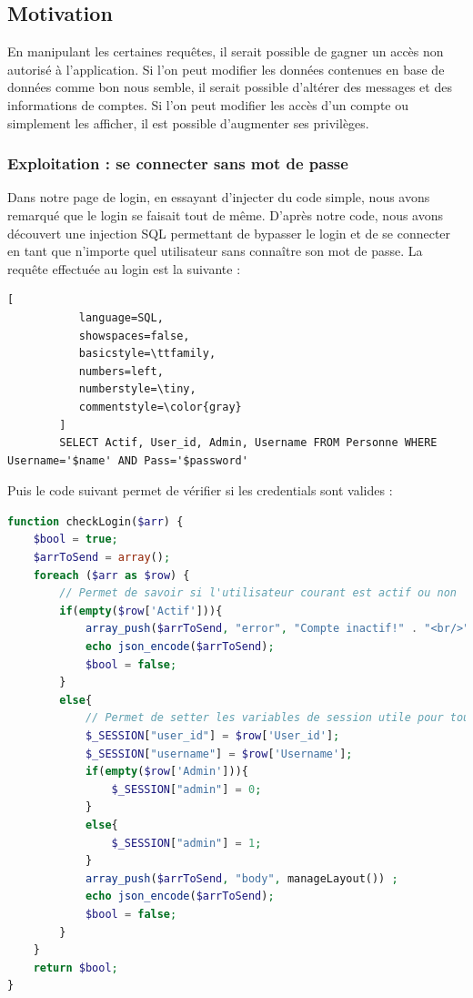 \documentclass[12pt]{article}
\begin{document}
\subsection{Motivation}
En manipulant les certaines requêtes, il serait possible de gagner un accès non autorisé à l'application. Si l'on peut modifier les données contenues en base de données comme bon nous semble, il serait possible d'altérer des messages et des informations de comptes. Si l'on peut modifier les accès d'un compte ou simplement les afficher, il est possible d'augmenter ses privilèges.
\subsubsection{Exploitation : se connecter sans mot de passe}
Dans notre page de login, en essayant d'injecter du code simple, nous avons remarqué que le login se faisait tout de même. D'après notre code, nous avons découvert une injection SQL permettant de bypasser le login et de se connecter en tant que n'importe quel utilisateur sans connaître son mot de passe. La requête effectuée au login est la suivante :

\begin{lstlisting}[
           language=SQL,
           showspaces=false,
           basicstyle=\ttfamily,
           numbers=left,
           numberstyle=\tiny,
           commentstyle=\color{gray}
        ]
        SELECT Actif, User_id, Admin, Username FROM Personne WHERE Username='$name' AND Pass='$password'
\end{lstlisting}

Puis le code suivant permet de vérifier si les credentials sont valides : 

\begin{lstlisting}[language=PHP]
function checkLogin($arr) {
    $bool = true;
    $arrToSend = array();
    foreach ($arr as $row) {
        // Permet de savoir si l'utilisateur courant est actif ou non
        if(empty($row['Actif'])){
            array_push($arrToSend, "error", "Compte inactif!" . "<br/>") ;
            echo json_encode($arrToSend);
            $bool = false;
        }
        else{
            // Permet de setter les variables de session utile pour toute la connection
            $_SESSION["user_id"] = $row['User_id'];
            $_SESSION["username"] = $row['Username'];
            if(empty($row['Admin'])){
                $_SESSION["admin"] = 0;
            }
            else{
                $_SESSION["admin"] = 1;
            }
            array_push($arrToSend, "body", manageLayout()) ;
            echo json_encode($arrToSend);
            $bool = false;
        }
    }
    return $bool;
}
\end{lstlisting}
\end{document}
